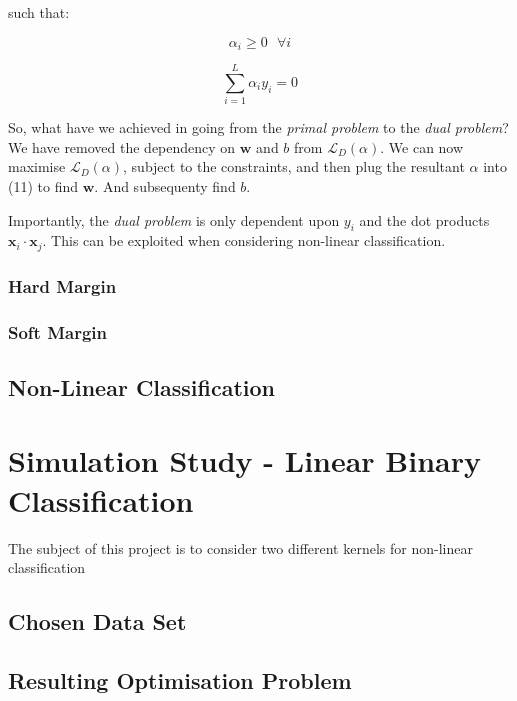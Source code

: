 \documentclass[10pt, a4paper,reqno]{amsart}
\begin{document}
such that:

\begin{equation}
\alpha_i\geq0\text{ }\forall{i}
\end{equation}

\begin{equation}
\sum_{i=1}^{L}\alpha_i y_i = 0
\end{equation}

So, what have we achieved in going from the \emph{primal problem} to the \emph{dual problem}? We have removed the dependency on $\mathbf{w}$ and $b$ from $\mathcal{L}_D(\alpha)$. We can now maximise $\mathcal{L}_D(\alpha)$, subject to the constraints, and then plug the resultant $\alpha$ into (11) to find $\mathbf{w}$. And subsequenty find $b$.

Importantly, the \emph{dual problem} is only dependent upon $y_i$ and the dot products $\mathbf{x}_i\cdot\mathbf{x}_j$. This can be exploited when considering non-linear classification.

\subsubsection{Hard Margin}

\subsubsection{Soft Margin}

\subsection{Non-Linear Classification}


%
%
\clearpage\section{Simulation Study - Linear Binary Classification}

The subject of this project is to consider two different kernels for non-linear classification

\subsection{Chosen Data Set}


\subsection{Resulting Optimisation Problem}
\end{document}
